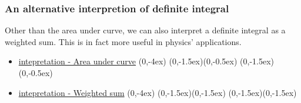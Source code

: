 \documentclass[class=article, crop=false, 12pt]{standalone}
\begin{document}


\subsubsection{An alternative interpretion of definite integral}

Other than the area under curve, we can also interpret a definite integral as a weighted sum. This is in fact more useful in physics' applications.

\begin{itemize}
    \item \ul{ intepretation - Area under curve}
        {(0,-4ex)}
        {(0,-1.5ex)}{(0,-0.5ex)}
        {(0,-1.5ex)}{(0,-0.5ex)}
    \\

    \item \ul{ intepretation - Weighted sum}
        {(0,-4ex)}
        {(0,-1.5ex)}{(0,-1.5ex)}
        {(0,-1.5ex)}{(0,-1.5ex)}
    \\
\end{itemize}
\end{document}
